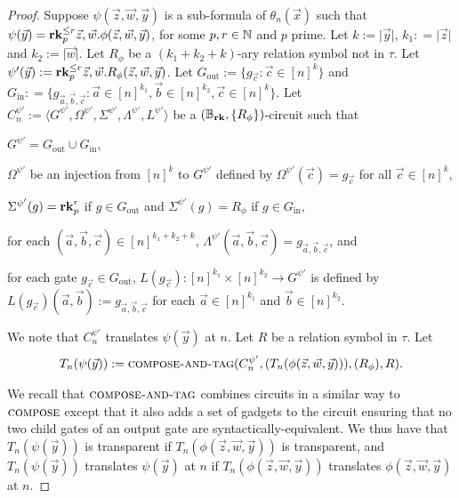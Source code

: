 \documentclass[../paper.tex]{subfiles}
\begin{document}
\begin{proof}
  Suppose $\psi(\vec{z}, \vec{w}, \vec{y})$ is a sub-formula of
  $\theta_n(\vec{x})$ such that $\psi (\vec{y}) = \text{\textbf{rk}}^{\leq r}_p \vec{z},
  \vec{w} .\phi(\vec{z}, \vec{w}, \vec{y})$, for some $p, r \in \mathbb{N}$ and $p$
  prime. Let $k:= \vert \vec{y} \vert$, $k_1 : = \vert \vec{z} \vert$ and $k_2
  := \vert \vec{w} \vert$. Let $R_\phi$ be a $(k_1 + k_2 + k)$-ary relation
  symbol not in $\tau$. Let $\psi'(\vec{y}) := \text{\textbf{rk}}^{\leq r}_p\vec{z}, \vec{w}.
  R_{\phi} (\vec{z}, \vec{w}, \vec{y})$. Let $G_{\text{out}} := \{g_{\vec{c}} :
  \vec{c} \in [n]^k\}$ and $G_{\text{in}} : = \{ g_{\vec{a}, \vec{b}, \vec{c}} :
  \vec{a} \in [n]^{k_1}, \vec{b} \in [n]^{k_2}, \vec{c} \in [n]^{k}\}$. Let
  $C^{\psi'}_n:= \langle G^{\psi'}, \Omega^{\psi'}, \Sigma^{\psi'},
  \Lambda^{\psi'}, L^{\psi'}\rangle$ be a $(\mathbb{B}_{\text{\textbf{rk}}}, \{ R_{\phi}
  \})$-circuit such that
  \begin{itemizens}
  \item $G^{\psi'} = G_{\text{out}} \cup G_{\text{in}}$,
  \item $\Omega^{\psi'}$ be an injection from $[n]^k$ to $G^{\psi'}$ defined by
    $\Omega^{\psi'}(\vec{c}) = g_{\vec{c}}$ for all $\vec{c} \in [n]^k$,
  \item $\Sigma^{\psi'} (g) = \text{\textbf{rk}}^r_p$ if $g \in G_{\text{out}}$ and
    $\Sigma^{\psi'}(g) = R_\phi$ if $g \in G_{\text{in}}$,
  \item for each $(\vec{a}, \vec{b}, \vec{c}) \in [n]^{k_1 +k_2 + k}$,
    $\Lambda^{\psi'} (\vec{a}, \vec{b}, \vec{c}) = g_{\vec{a}, \vec{b},
      \vec{c}}$, and
  \item for each gate $g_{\vec{c}} \in G_{\text{out}}$, $L(g_{\vec{c}}):
    [n]^{k_1} \times [n]^{k_2} \rightarrow G^{\psi'}$ is defined by
    $L(g_{\vec{c}})(\vec{a}, \vec{b}) := g_{\vec{a}, \vec{b}, \vec{c}}$ for each
    $\vec{a} \in [n]^{k_1}$ and $\vec{b} \in [n]^{k_2}$.
  \end{itemizens}

  We note that $C^{\psi'}_n$ translates $\psi (\vec{y})$ at $n$. Let $R$ be a
  relation symbol in $\tau$. Let
  \begin{align*} T_n(\psi(\vec{y})) := {\normalfont\textsc{compose-and-tag}}(C^{\psi'}_n,
    (T_n(\phi(\vec{z}, \vec{w}, \vec{y}))), (R_\phi), R).
  \end{align*}

  We recall that ${\normalfont\textsc{compose-and-tag}}$ combines circuits in a similar way to
  ${\normalfont\textsc{compose}}$ except that it also adds a set of gadgets to the circuit
  ensuring that no two child gates of an output gate are
  syntactically-equivalent. We thus have that $T_n(\psi (\vec{y}))$ is
  transparent if $T_n(\phi (\vec{z}, \vec{w},\vec{y}))$ is transparent, and
  $T_n(\psi(\vec{y}))$ translates $\psi (\vec{y})$ at $n$ if $T_n(\phi (\vec{z},
  \vec{w},\vec{y}))$ translates $\phi(\vec{z}, \vec{w}, \vec{y})$ at $n$.


\end{proof}
\end{document}

